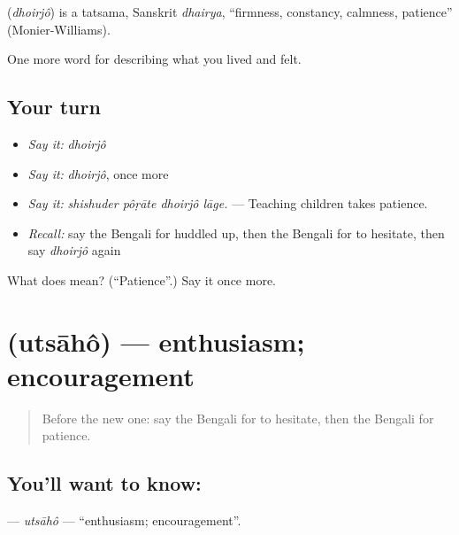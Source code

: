 \begin{cousinweb}
\textbf{} (\emph{dhoirjô}) is a tatsama, Sanskrit \emph{dhairya}, \textquotedblleft{}firmness, constancy, calmness, patience\textquotedblright{} (Monier-Williams).
\end{cousinweb}

\begin{grammarlens}[title={What you've built}]
One more word for describing what you lived and felt.
\end{grammarlens}

\subsection*{Your turn}
\begin{itemize}
\raggedright
  \item \emph{Say it:} \emph{dhoirjô}
  \item \emph{Say it:} \emph{dhoirjô}, once more
  \item \emph{Say it:} \emph{shishuder pôṛāte dhoirjô lāge.} — Teaching children takes patience.
  \item \emph{Recall:} say the Bengali for huddled up, then the Bengali for to hesitate, then say \emph{dhoirjô} again
\end{itemize}

\begin{tcolorbox}[breakable,colback=teal!4,colframe=teal!35!black,title={Before you move on}]
What does  mean? (\textquotedblleft{}Patience\textquotedblright{}.) Say it once more.
\end{tcolorbox}
\section[\texorpdfstring{\bn{উৎসাহ} (utsāhô)}{উৎসাহ (utsāhô)}]{ (utsāhô) — enthusiasm; encouragement}

\label{lesson:BN-C455-utsaho}



\begin{quote}
Before the new one: say the Bengali for to hesitate, then the Bengali for patience.
\end{quote}

\subsection*{You'll want to know: }
\textbf{} — \emph{utsāhô} — \textquotedblleft{}enthusiasm; encouragement\textquotedblright{}.

